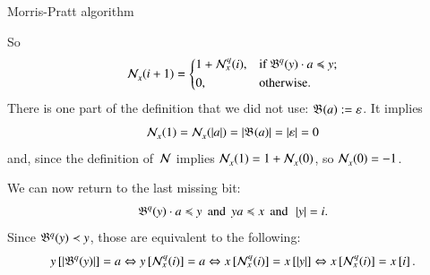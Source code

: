 %
\begin{frame}{Morris-Pratt algorithm}

  So
  \begin{equation*}
\mathcal{N}_{x}^{}(i+1) =
\left\{
  \begin{aligned}
   & 1 + \mathcal{N}_{x}^{q}(i),
   && \text{if \(\mathfrak{B}^{q}(y) \cdot a \mathrel{\preccurlyeq}y\)};\\
   & 0,
   && \text{otherwise.}
  \end{aligned}
\right.
\end{equation*}
There is one part of the definition that we did not use:
\({\mathfrak{B}^{}(a) := \varepsilon}\). It implies
\begin{equation*}
  \mathcal{N}_{x}^{}(1) = \mathcal{N}_{x}^{}(\left\lvert\smash{a}\right\rvert) = \left\lvert\smash{\mathfrak{B}^{}(a)}\right\rvert =
  \left\lvert\smash{\varepsilon}\right\rvert = 0
\end{equation*}
and, since the definition of~\(\mathcal{N}\) implies
\(\mathcal{N}_{x}^{}(1) = 1 + \mathcal{N}_{x}^{}(0)\), so
\(\mathcal{N}_{x}^{}(0) = -1\).

\bigskip

We can now return to the last missing bit:
\begin{equation*}
\mathfrak{B}^{q}(y) \cdot a \mathrel{\preccurlyeq} y
\,\; \text{and} \,\; ya \mathrel{\preccurlyeq} x \,\;\text{and}\,\; \left\lvert\smash{y}\right\rvert = i.
\end{equation*}
Since \(\mathfrak{B}^{q}(y) \mathrel{\prec} y\), those are equivalent to the following:
\begin{equation*}
  \smash{{y}\left[\smash{\left\lvert\smash{\mathfrak{B}^{q}(y)}\right\rvert}\right]} = a \Leftrightarrow
\smash{{y}\left[\smash{\mathcal{N}_{x}^{q}(i)}\right]} = a \Leftrightarrow
\smash{{x}\left[\smash{\mathcal{N}_{x}^{q}(i)}\right]} = \smash{{x}\left[\smash{\left\lvert\smash{y}\right\rvert}\right]}
\Leftrightarrow \smash{{x}\left[\smash{\mathcal{N}_{x}^{q}(i)}\right]} = {x}\left[\smash{i}\right].
\end{equation*}

\end{frame}

